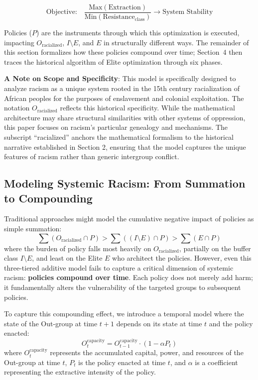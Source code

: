 \documentclass[12pt]{article}
\begin{document}
\[
\text{Objective:} \quad \frac{\text{Max}(\text{Extraction})}{\text{Min}(\text{Resistance}_{\text{class}})} \rightarrow \text{System Stability}
\]

Policies ($P$) are the instruments through which this optimization is executed, impacting $O_{\text{racialized}}$, $I \setminus E$, and $E$ in structurally different ways. The remainder of this section formalizes how these policies compound over time; Section~4 then traces the historical algorithm of Elite optimization through six phases.

\textbf{A Note on Scope and Specificity}: This model is specifically designed to analyze racism as a unique system rooted in the 15th century racialization of African peoples for the purposes of enslavement and colonial exploitation. The notation $O_{\text{racialized}}$ reflects this historical specificity. While the mathematical architecture may share structural similarities with other systems of oppression, this paper focuses on racism's particular genealogy and mechanisms. The subscript ``racialized'' anchors the mathematical formalism to the historical narrative established in Section 2, ensuring that the model captures the unique features of racism rather than generic intergroup conflict.

\subsection{Modeling Systemic Racism: From Summation to Compounding}

Traditional approaches might model the cumulative negative impact of policies as simple summation:
\[
\sum (O_{\text{racialized}} \cap P) > \sum ((I \setminus E) \cap P) > \sum (E \cap P)
\]
where the burden of policy falls most heavily on $O_{\text{racialized}}$, partially on the buffer class $I \setminus E$, and least on the Elite $E$ who architect the policies. However, even this three-tiered additive model fails to capture a critical dimension of systemic racism: \textbf{policies compound over time}. Each policy does not merely add harm; it fundamentally alters the vulnerability of the targeted groups to subsequent policies.

To capture this compounding effect, we introduce a temporal model where the state of the Out-group at time $t+1$ depends on its state at time $t$ and the policy enacted:
\[
O_t^{\text{capacity}} = O_{t-1}^{\text{capacity}} \cdot (1 - \alpha P_t)
\]
where $O_t^{\text{capacity}}$ represents the accumulated capital, power, and resources of the Out-group at time $t$, $P_t$ is the policy enacted at time $t$, and $\alpha$ is a coefficient representing the extractive intensity of the policy.
\end{document}
